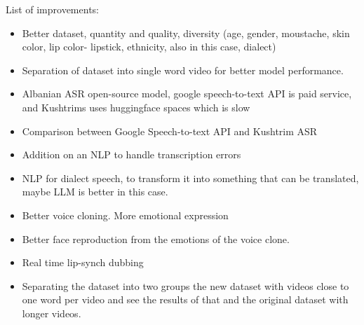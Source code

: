 \documentclass[12pt]{article}
\begin{document}
List of improvements:
\begin{itemize}
    \item Better dataset, quantity and quality, diversity (age, gender, moustache, skin color, lip color- lipstick, ethnicity, also in this case, dialect)
    \item Separation of dataset into single word video for better model performance.
    \item Albanian ASR open-source model, google speech-to-text API is paid service, and Kushtrims uses huggingface spaces which is slow
    \item Comparison between Google Speech-to-text API and Kushtrim ASR
    \item Addition on an NLP to handle transcription errors
    \item NLP for dialect speech, to transform it into something that can be translated, maybe LLM is better in this case.
    \item Better voice cloning. More emotional expression
    \item Better face reproduction from the emotions of the voice clone.
    \item Real time lip-synch dubbing
    \item Separating the dataset into two groups the new dataset with videos close to one word per video and see the results of that and the original dataset with longer videos. 
\end{itemize}



\end{document}
